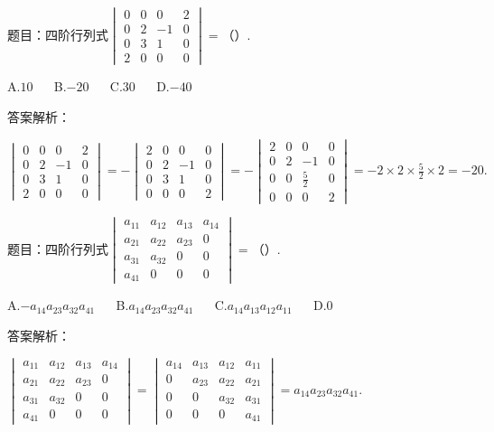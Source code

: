 题目：$\mathrm{四阶行列式}\begin{vmatrix}0&0&0&2\\0&2&-1&0\\0&3&1&0\\2&0&0&0\end{vmatrix}=（）.$

A.$10$ $\quad$ B.$-20$ $\quad$ C.$30$ $\quad$ D.$-40$

答案解析：

$\begin{vmatrix}0&0&0&2\\0&2&-1&0\\0&3&1&0\\2&0&0&0\end{vmatrix}=-\begin{vmatrix}2&0&0&0\\0&2&-1&0\\0&3&1&0\\0&0&0&2\end{vmatrix}=-\begin{vmatrix}2&0&0&0\\0&2&-1&0\\0&0&\frac52&0\\0&0&0&2\end{vmatrix}=-2\times2\times\frac52\times2=-20.$



题目：$\mathrm{四阶行列式}\begin{vmatrix}a_{11}&a_{12}&a_{13}&a_{14}\\a_{21}&a_{22}&a_{23}&0\\a_{31}&a_{32}&0&0\\a_{41}&0&0&0\end{vmatrix}=（）.$

A.$-a_{14}a_{23}a_{32}a_{41}$ $\quad$ B.$a_{14}a_{23}a_{32}a_{41}$ $\quad$ C.$a_{14}a_{13}a_{12}a_{11}$ $\quad$ D.$0$

答案解析：

$\begin{vmatrix}a_{11}&a_{12}&a_{13}&a_{14}\\a_{21}&a_{22}&a_{23}&0\\a_{31}&a_{32}&0&0\\a_{41}&0&0&0\end{vmatrix}=\begin{vmatrix}a_{14}&a_{13}&a_{12}&a_{11}\\0&a_{23}&a_{22}&a_{21}\\0&0&a_{32}&a_{31}\\0&0&0&a_{41}\end{vmatrix}=a_{14}a_{23}a_{32}a_{41}.$



